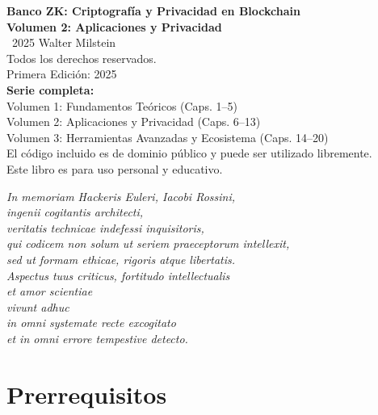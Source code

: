 \documentclass[11pt,a4paper,twoside]{book}
\begin{document}
\thispagestyle{empty}
\null\vfill
\begin{center}
\textbf{Banco ZK: Criptograf\'ia y Privacidad en Blockchain}\\
\textbf{Volumen 2: Aplicaciones y Privacidad}\\[1cm]
\textcopyright\ 2025 Walter Milstein\\
Todos los derechos reservados.\\[0.5cm]
Primera Edici\'on: 2025\\[1cm]
\textbf{Serie completa:}\\
Volumen 1: Fundamentos Te\'oricos (Caps. 1--5)\\
Volumen 2: Aplicaciones y Privacidad (Caps. 6--13)\\
Volumen 3: Herramientas Avanzadas y Ecosistema (Caps. 14--20)\\[1cm]
El c\'odigo incluido es de dominio p\'ublico y puede ser utilizado libremente.\\
Este libro es para uso personal y educativo.
\end{center}
\vfill
\cleardoublepage





\thispagestyle{empty}
\null\vfill
\begin{flushright}
\textit{\large In memoriam Hackeris Euleri, Iacobi Rossini,\\[0.3cm]
ingenii cogitantis architecti,\\
veritatis technicae indefessi inquisitoris,\\
qui codicem non solum ut seriem praeceptorum intellexit,\\
sed ut formam ethicae, rigoris atque libertatis.\\[0.5cm]
Aspectus tuus criticus, fortitudo intellectualis\\
et amor scientiae\\
vivunt adhuc\\
in omni systemate recte excogitato\\
et in omni errore tempestive detecto.}
\end{flushright}
\vfill
\cleardoublepage

\chapter*{Prerrequisitos}
\end{document}
